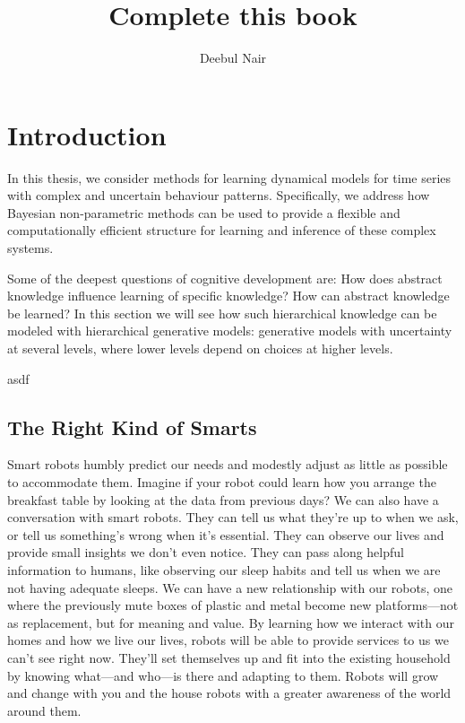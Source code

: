 \documentclass[11pt]{book}
\title{\textbf{Complete this book }}
\author{Deebul Nair}
\date{}
\begin{document}
\chapter{Introduction}


In this thesis, we consider methods for learning dynamical models for time series with complex and uncertain behaviour patterns. Specifically, we address how Bayesian non-parametric methods can be used to provide a flexible and computationally efficient structure for learning and inference of these complex systems.

Some of the deepest questions of cognitive development are: How does abstract knowledge influence learning of specific knowledge? How can abstract knowledge be learned? In this section we will see how such hierarchical knowledge can be modeled with hierarchical generative models: generative models with uncertainty at several levels, where lower levels depend on choices at higher levels.

\begin{description}
	\item[asdf] 
\end{description}
\section{ The Right Kind of Smarts }
Smart robots humbly predict our needs and modestly adjust as little as possible to accommodate them. Imagine if your robot could learn how you arrange the breakfast table by looking at the data from previous days? 
We can also have a conversation with smart robots. They can tell us what they’re up to when we ask, or tell us something’s wrong when it’s essential. They can observe our lives and provide small insights we don’t even notice. They can pass along helpful information to humans, like observing our sleep habits and tell us when we are not having adequate sleeps.
We can have a new relationship with our robots, one where the previously mute boxes of plastic and metal become new platforms—not as replacement, but for meaning and value. By learning how we interact with our homes and how we live our lives, robots will be able to provide services to us we can’t see right now. They’ll set themselves up and fit into the existing household by knowing what—and who—is there and adapting to them. Robots will grow and change with you and the house robots with a greater awareness of the world around them.
\end{document}
